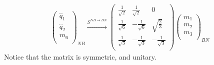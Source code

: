 \begin{align}
\left( \begin{matrix}
\widehat{{q}}_1\\
\widehat{{q}}_2\\
{m}_6\\
\end{matrix} \right)_{NB}
\xrightarrow{S^{NB \rightarrow BN}}
\left( \begin{matrix}
\frac{1}{\sqrt{2}}& \frac{1}{\sqrt{2}}& 0 \\
\frac{1}{\sqrt{6}} & - \frac{1}{\sqrt{6}} & \sqrt{\frac{2}{3}} \\
\frac{1}{\sqrt{3}} & - \frac{1}{\sqrt{3}} & - \frac{1}{\sqrt{3}} \\
\end{matrix} \right)
\left( \begin{matrix}
{m}_1\\
{m}_2\\
{m}_3\\
\end{matrix} \right)_{BN}
\end{align}
Notice that the matrix is symmetric, and unitary.


